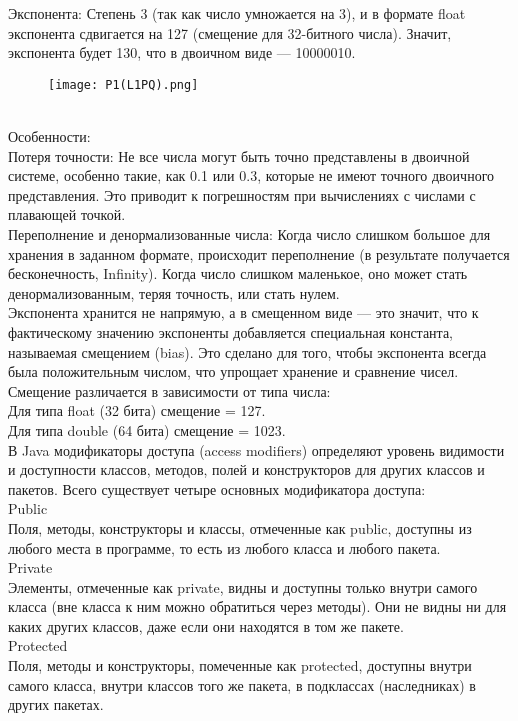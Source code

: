 Экспонента: Степень 3 (так как число умножается на 3), и в формате float экспонента сдвигается на 127 (смещение для 32-битного числа). Значит, экспонента будет 130, что в двоичном виде — 10000010.
\begin{figure}[h]
    \centering
    \texttt{[image: P1(L1PQ).png]} 
    \label{fig:example}
\end{figure} \\
Особенности: \\
Потеря точности: Не все числа могут быть точно представлены в двоичной системе, особенно такие, как 0.1 или 0.3, которые не имеют точного двоичного представления. Это приводит к погрешностям при вычислениях с числами с плавающей точкой. \\
Переполнение и денормализованные числа: Когда число слишком большое для хранения в заданном формате, происходит переполнение (в результате получается бесконечность, Infinity). Когда число слишком маленькое, оно может стать денормализованным, теряя точность, или стать нулем. \\
Экспонента хранится не напрямую, а в смещенном виде — это значит, что к фактическому значению экспоненты добавляется специальная константа, называемая смещением (bias). Это сделано для того, чтобы экспонента всегда была положительным числом, что упрощает хранение и сравнение чисел. Смещение различается в зависимости от типа числа: \\
Для типа float (32 бита) смещение = 127. \\
Для типа double (64 бита) смещение = 1023. \\
В Java модификаторы доступа (access modifiers) определяют уровень видимости и доступности классов, методов, полей и конструкторов для других классов и пакетов. Всего существует четыре основных модификатора доступа: \\
Public \\
Поля, методы, конструкторы и классы, отмеченные как public, доступны из любого места в программе, то есть из любого класса и любого пакета. \\
Private \\
Элементы, отмеченные как private, видны и доступны только внутри самого класса (вне класса к ним можно обратиться через методы). Они не видны ни для каких других классов, даже если они находятся в том же пакете. \\
Protected \\
Поля, методы и конструкторы, помеченные как protected, доступны внутри самого класса, внутри классов того же пакета, в подклассах (наследниках) в других пакетах. \\
